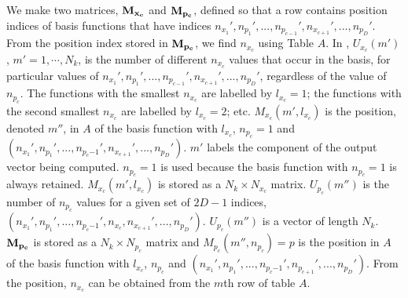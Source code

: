 %
%
%

%
We  make two matrices,   ${\bf{M_{x_c}}}$ and ${\bf{M_{p_c}}}$, defined so that a row contains 
 position indices   of basis functions  that have  indices  
$n_{x_1}',n_{p_1}',..., n_{p_{c-1}}',n_{x_{c+1}}',...,n_{p_{D}}'$. 
%
%
 From the position index stored in  ${\bf{M_{p_c}}}$, we find   
 $n_{x_{c}}$ using Table $A$.   
%
In ,  
$ U_{x_c}(m')$, $ m'=1, \cdots,  N_k$,  is  the number of different 
 $n_{x_{c}}$ values that occur in the basis, for  particular values of  $n_{x_1}',n_{p_1}',..., n_{p_{c-1}}',n_{x_{c+1}}',...,n_{p_{D}}'$, regardless of the value of    $n_{p_{c}}$.
% 
The functions with the smallest  $n_{x_{c}}$ are labelled by  $l_{x_{c}}=1$; 
the functions with the  second smallest  $n_{x_{c}}$ are  labelled by  $l_{x_{c}}=2$; etc.  
%
 $M_{x_c}(m',l_{x_c})$  is     the 
position,     denoted  $m''$,      in $A$ of the basis function      with  $l_{x_c}$,    $n_{p_c}=1$  and 
 $({n_{x_1}',n_{p_1}',...,n_{p_c{-1}}',n_{x_{c+1}}',...,n_{p_{D}}'})$.  
$m'$  labels the component of the output vector being computed.   $n_{p_c}=1$ is used because the basis function with  $n_{p_c}=1$ is always retained.  
%
$M_{x_c}(m',l_{x_c})$ is stored as a $N_k\times N_{x_c}$ matrix. 
%
%
% 
%
  $U_{p_c}(m'')$ is  the number of $n_{p_c}$ values for a given set of $2D-1$ indices,  
  $({n_{x_1}',n_{p_1}',...,n_{p_c{-1}}',n_{x_{c}},n_{x_{c+1}}',...,n_{p_{D}}'})$.
  $U_{p_c}(m'')$ is a vector of length $N_k$.  
%
 ${\bf{M_{p_c}}}$ is stored as a  $N_k\times N_{p_c}$ matrix  and 
$M_{p_c}(m'',n_{p_c}) = p$   is the position  in $A$ of the basis function      with  $l_{x_c}$,    $n_{p_c}$  and 
$({n_{x_1}',n_{p_1}',...,n_{p_c{-1}}',n_{p_{c+1}}',...,n_{p_{D}}'})$.   From the position, 
$n_{x_c}$ can be obtained from the $m${th} row of table $A$.







